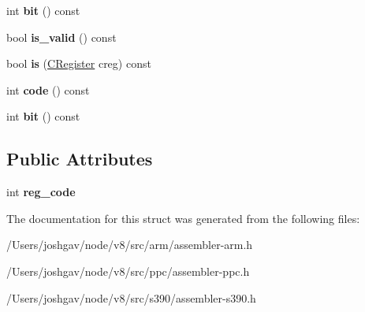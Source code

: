 \begin{DoxyCompactItemize}
\item 
int {\bfseries bit} () const \hypertarget{structv8_1_1internal_1_1_c_register_a28cb314dbb3c321107f1175e2f40389c}{}\label{structv8_1_1internal_1_1_c_register_a28cb314dbb3c321107f1175e2f40389c}

\item 
bool {\bfseries is\+\_\+valid} () const \hypertarget{structv8_1_1internal_1_1_c_register_a6aba769bc6ee2fce1c5702ab51b1d0ac}{}\label{structv8_1_1internal_1_1_c_register_a6aba769bc6ee2fce1c5702ab51b1d0ac}

\item 
bool {\bfseries is} (\hyperlink{structv8_1_1internal_1_1_c_register}{C\+Register} creg) const \hypertarget{structv8_1_1internal_1_1_c_register_af7b2a162aa1e3f87c452854f0f32e595}{}\label{structv8_1_1internal_1_1_c_register_af7b2a162aa1e3f87c452854f0f32e595}

\item 
int {\bfseries code} () const \hypertarget{structv8_1_1internal_1_1_c_register_ab6d3af9fba89e69fa228a348c686552e}{}\label{structv8_1_1internal_1_1_c_register_ab6d3af9fba89e69fa228a348c686552e}

\item 
int {\bfseries bit} () const \hypertarget{structv8_1_1internal_1_1_c_register_a28cb314dbb3c321107f1175e2f40389c}{}\label{structv8_1_1internal_1_1_c_register_a28cb314dbb3c321107f1175e2f40389c}

\end{DoxyCompactItemize}
\subsection*{Public Attributes}
\begin{DoxyCompactItemize}
\item 
int {\bfseries reg\+\_\+code}\hypertarget{structv8_1_1internal_1_1_c_register_acbcaf2cad6a7ea4bcd1c8e4a477ca867}{}\label{structv8_1_1internal_1_1_c_register_acbcaf2cad6a7ea4bcd1c8e4a477ca867}

\end{DoxyCompactItemize}


The documentation for this struct was generated from the following files\+:\begin{DoxyCompactItemize}
\item 
/\+Users/joshgav/node/v8/src/arm/assembler-\/arm.\+h\item 
/\+Users/joshgav/node/v8/src/ppc/assembler-\/ppc.\+h\item 
/\+Users/joshgav/node/v8/src/s390/assembler-\/s390.\+h\end{DoxyCompactItemize}
